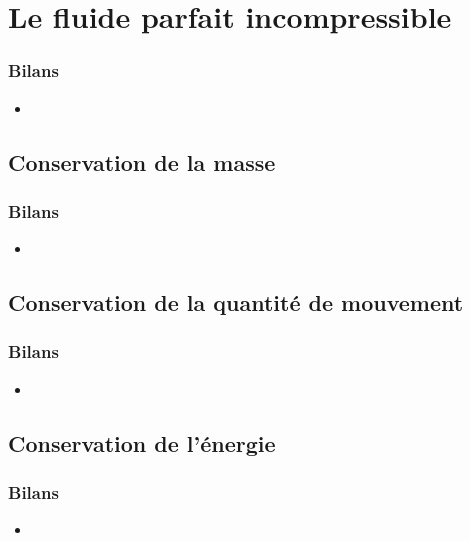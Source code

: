 \documentclass[%
	final, %
	 10pt, %
 	compress, %
hyperref={bookmarks=true}	
]{beamer}
\begin{document}
\section{Le fluide parfait incompressible}
\label{sec:le-fluide-parfait}

\begin{frame}\frametitle{Bilans}
\begin{itemize}
\item 
\end{itemize}
\end{frame}

\subsection{Conservation de la masse}
\label{sec:conservation-de-la}

\begin{frame}\frametitle{Bilans}
\begin{itemize}
\item 
\end{itemize}
\end{frame}

\subsection{Conservation de la quantité de mouvement}
\label{sec:conservation-de-la-1}

\begin{frame}\frametitle{Bilans}
\begin{itemize}
\item 
\end{itemize}
\end{frame}

\subsection{Conservation de l'énergie}
\label{sec:cons-de-lenerg}

\begin{frame}\frametitle{Bilans}
\begin{itemize}
\item 
\end{itemize}
\end{frame}
\end{document}
